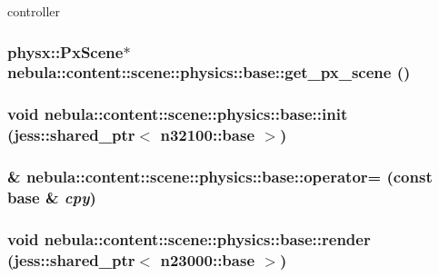 controller \hypertarget{classnebula_1_1content_1_1scene_1_1physics_1_1base_a134531a81a5c1debd180bde31a3d722a}{
\subsubsection[{get\_\-px\_\-scene}]{\setlength{\rightskip}{0pt plus 5cm}physx::PxScene$\ast$ nebula::content::scene::physics::base::get\_\-px\_\-scene ()}}
\label{classnebula_1_1content_1_1scene_1_1physics_1_1base_a134531a81a5c1debd180bde31a3d722a}
\hypertarget{classnebula_1_1content_1_1scene_1_1physics_1_1base_a7ed41d6ac0f30383f9850d0fe63f42b0}{
\subsubsection[{init}]{\setlength{\rightskip}{0pt plus 5cm}void nebula::content::scene::physics::base::init (jess::shared\_\-ptr$<$ {\bf n32100::base} $>$)}}
\label{classnebula_1_1content_1_1scene_1_1physics_1_1base_a7ed41d6ac0f30383f9850d0fe63f42b0}
\hypertarget{classnebula_1_1content_1_1scene_1_1physics_1_1base_ae87709e0143d951222b9c25e729465db}{
\subsubsection[{operator=}]{ \& nebula::content::scene::physics::base::operator= (const {\bf base} \& {\em cpy})}}
\label{classnebula_1_1content_1_1scene_1_1physics_1_1base_ae87709e0143d951222b9c25e729465db}
\hypertarget{classnebula_1_1content_1_1scene_1_1physics_1_1base_a2630effa0e3bacf02008aa4620cb2e25}{
\subsubsection[{render}]{\setlength{\rightskip}{0pt plus 5cm}void nebula::content::scene::physics::base::render (jess::shared\_\-ptr$<$ {\bf n23000::base} $>$)}}
